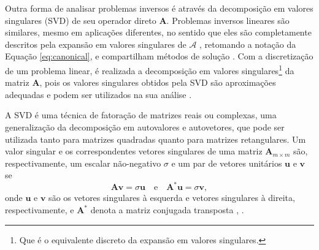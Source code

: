 Outra forma de analisar problemas inversos é através da decomposição em valores singulares (SVD) de seu operador direto $\mathbf{A}$. Problemas inversos lineares são similares, mesmo em aplicações diferentes, no sentido que eles são completamente descritos pela expansão em valores singulares de $\mathcal{A}$ \cite[pág. xi] {Mueller2012}, retomando a notação da Equação \eqref{eq:canonical}, e compartilham métodos de solução \cite[pág. 10]{aster2019parameter}. Com a discretização de um problema linear, é realizada a decomposição em valores singulares\footnote{Que é o equivalente discreto da expansão em valores singulares.} da matriz $\mathbf{A}$, pois os valores singulares obtidos pela SVD são aproximações adequadas e podem ser utilizados na sua análise \cite[Subseção 3.3]{hansen2010discrete}. 

A SVD é uma técnica de fatoração de matrizes reais ou complexas, uma generalização da decomposição em autovalores e autovetores, que pode ser utilizada tanto para matrizes quadradas quanto para matrizes retangulares. Um valor singular e os correspondentes vetores singulares de uma matriz $\mathbf{A}_{m \times m}$ são, respectivamente, um escalar não-negativo $\sigma$ e um par de vetores unitários ${\mathbf{u}}$ e ${\mathbf{v}} $ se
\begin{equation}
\mathbf{A} {\mathbf{v}}=\sigma {\mathbf{u}}  \quad \text{e} \quad \mathbf{A} ^{*}{\mathbf{u}}=\sigma {\mathbf{v}},
\label{eq:SVD0}
\end{equation}
onde $\mathbf{u}$ e ${\mathbf{v}}$ são os vetores singulares à esquerda e vetores singulares à direita, respectivamente, e $\mathbf{A}^*$ denota a matriz conjugada transposta \cite{Strang1993}, \cite[corolário 2.4.2]{golub2013matrix}. 

